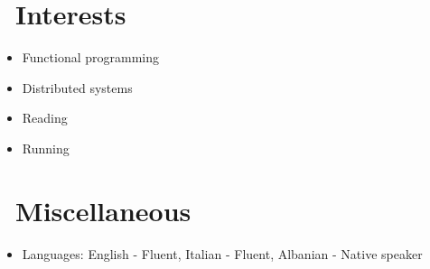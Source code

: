 \documentclass{resume}
\begin{document}
\section{\faHeartO\ Interests}
\begin{itemize}[parsep=0.5ex]
  \item Functional programming
  \item Distributed systems
  \item Reading
  \item Running
\end{itemize}

\section{\faInfo\ Miscellaneous}
\begin{itemize}[parsep=0.5ex]
  \item Languages: English - Fluent, Italian - Fluent, Albanian - Native speaker
\end{itemize}

%
%
\end{document}
